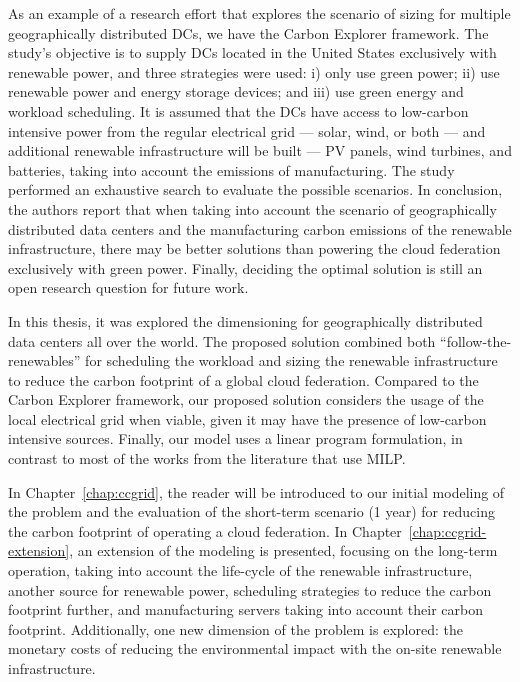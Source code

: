 As an example of a research effort that explores the scenario of sizing for multiple geographically distributed DCs, we have the Carbon Explorer framework\cite{acun2022holistic}. The study's objective is to supply DCs located in the United States exclusively with renewable power, and three strategies were used: i) only use green power; ii) use renewable power and energy storage devices; and iii) use green energy and workload scheduling. It is assumed that the DCs have access to low-carbon intensive power from the regular electrical grid --- solar, wind, or both --- and additional renewable infrastructure will be built --- PV panels, wind turbines, and batteries, taking into account the emissions of manufacturing. The study performed an exhaustive search to evaluate the possible scenarios. In conclusion, the authors report that when taking into account the scenario of geographically distributed data centers and the manufacturing carbon emissions of the renewable infrastructure, there may be better solutions than powering the cloud federation exclusively with green power. Finally, deciding the optimal solution is still an open research question for future work.


In this thesis, it was explored the dimensioning for geographically distributed data centers all over the world. The proposed solution combined both ``follow-the-renewables'' for scheduling the workload and sizing the renewable infrastructure to reduce the carbon footprint of a global cloud federation. Compared to the Carbon Explorer framework, our proposed solution considers the usage of the local electrical grid when viable, given it may have the presence of low-carbon intensive sources. Finally, our model uses a linear program formulation, in contrast to most of the works from the literature that use MILP.

In Chapter~\ref{chap:ccgrid}, the reader will be introduced to our initial modeling of the problem and the evaluation of the short-term scenario (1 year) for reducing the carbon footprint of operating a cloud federation. In Chapter~\ref{chap:ccgrid-extension}, an extension of the modeling is presented, focusing on the long-term operation, taking into account the life-cycle of the renewable infrastructure, another source for renewable power, scheduling strategies to reduce the carbon footprint further, and manufacturing servers taking into account their carbon footprint. Additionally,  one new dimension of the problem is explored: the monetary costs of reducing the environmental impact with the on-site renewable infrastructure.

